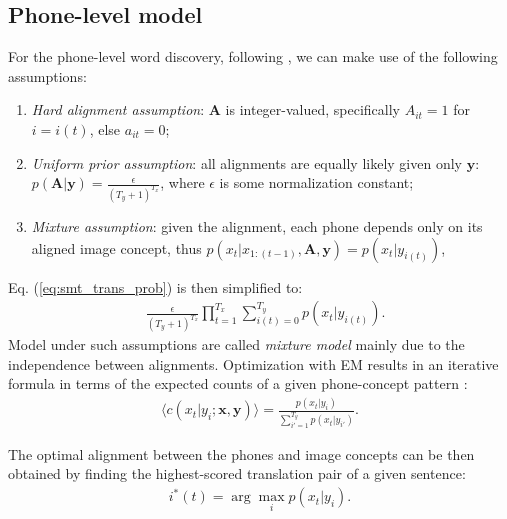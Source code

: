 \documentclass[journal]{IEEEtran}
\begin{document}
\subsection{Phone-level model}
 For the phone-level word discovery, following \cite{Brown92}, we can make use of the following assumptions:
\begin{enumerate}
    \item \textit{Hard alignment assumption}: $\mathbf{A}$ is integer-valued, specifically $A_{it}=1$ for $i=i(t)$, else $a_{it}=0$;
    \item \textit{Uniform prior assumption}: all alignments are equally likely given only $\mathbf{y}$: $p(\mathbf A|\mathbf y) = \frac{\epsilon}{(T_y+1)^{T_x}}$, where $\epsilon$ is some normalization constant;
    \item \textit{Mixture assumption}: given the alignment,
each phone depends only on its aligned image concept, thus
$p(x_t|x_{1:(t-1)},\mathbf{A},\mathbf{y})=p(x_t|y_{i(t)})$,
\end{enumerate}
Eq. (\ref{eq:smt_trans_prob}) is then simplified to:
\begin{align}
    &\frac{\epsilon}{(T_y+1)^{T_x}}\prod_{t=1}^{T_x}\sum_{i(t)=0}^{T_y} p(x_t|y_{i(t)}).
\end{align}
Model under such assumptions are called \textit{mixture model} mainly due to the independence between alignments. Optimization with EM results in 
an iterative formula
in terms of the expected counts of a given phone-concept pattern \cite{Brown93}:
\begin{align}
\label{eq:expected_count_ibm1}
    \langle c(x_t|y_i;\mathbf x, \mathbf y)\rangle = \frac{p(x_t|y_i)}{\sum_{i'=1}^{T_y}p(x_t|y_{i'})}.
\end{align}

The optimal alignment between the phones and image concepts can be then obtained by finding the highest-scored translation pair of a given sentence:
\begin{align}\label{eq:smt_alignment}
    i^*(t) = \arg\max_i p(x_t|y_i).
\end{align}
\end{document}
